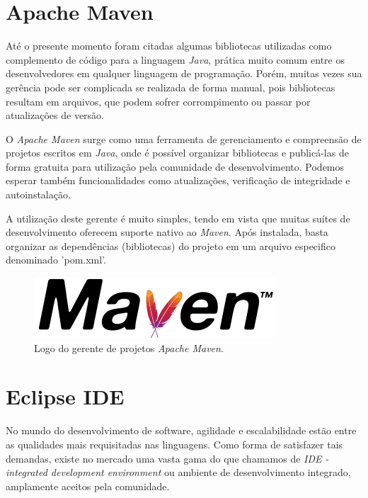 \documentclass[
	12pt,			%
	openright,		%
	oneside,	
	a4paper,		%
	english,		%
	brazil			%
]{abntex2/abntex2}  %
\begin{document}
	\section{Apache Maven}
	
	Até o presente momento foram citadas algumas bibliotecas utilizadas como complemento de código para a linguagem \textit{Java}, prática muito comum entre os desenvolvedores em qualquer linguagem de programação. Porém, muitas vezes sua gerência pode ser complicada se realizada de forma manual, pois bibliotecas resultam em arquivos, que podem sofrer corrompimento ou passar por atualizações de versão.
	
	O \textit{Apache Maven} \cite{maven} surge como uma ferramenta de gerenciamento e compreensão de projetos escritos em \textit{Java}, onde é possível organizar bibliotecas e publicá-las de forma gratuita para utilização pela comunidade de desenvolvimento. Podemos esperar também funcionalidades como atualizações, verificação de integridade e autoinstalação.
	
	A utilização deste gerente é muito simples, tendo em vista que muitas suítes de desenvolvimento oferecem suporte nativo ao \textit{Maven}. Após instalada, basta organizar as dependências (bibliotecas) do projeto em um arquivo especifico denominado 'pom.xml'.

	\begin{figure}[H]
		\caption{\label{maven-logo}Logo do gerente de projetos \textit{Apache Maven}.}
		\begin{center}
			\includegraphics[scale=0.5]{img/maven-logo}
		\end{center}
	\end{figure}

	\section{Eclipse IDE}
	
	No mundo do desenvolvimento de software, agilidade e escalabilidade estão entre as qualidades mais requisitadas nas linguagens. Como forma de satisfazer tais demandas, existe no mercado uma vasta gama do que chamamos de \textit{IDE - integrated development environment} ou ambiente de desenvolvimento integrado, amplamente aceitos pela comunidade.
	
\end{document}
